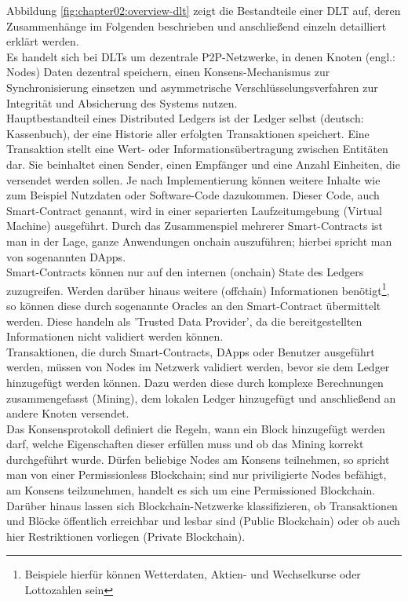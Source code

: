 Abbildung \ref{fig:chapter02:overview-dlt} zeigt die Bestandteile einer \ac{DLT} auf, deren Zusammenhänge im Folgenden beschrieben und anschließend einzeln detailliert erklärt werden.\\
Es handelt sich bei \acp{DLT} um dezentrale \ac{P2P}-Netzwerke, in denen Knoten (engl.: Nodes) Daten dezentral speichern, einen Konsens-Mechanismus zur Synchronisierung einsetzen und asymmetrische Verschlüsselungsverfahren zur Integrität und Absicherung des Systems nutzen. \cite{DLT2016}\\
Hauptbestandteil eines Distributed Ledgers ist der Ledger selbst (deutsch: Kassenbuch), der eine Historie aller erfolgten Transaktionen speichert. Eine Transaktion stellt eine Wert- oder Informationsübertragung zwischen Entitäten dar. Sie beinhaltet einen Sender, einen Empfänger und eine Anzahl Einheiten, die versendet werden sollen. Je nach Implementierung können weitere Inhalte wie zum Beispiel Nutzdaten oder Software-Code dazukommen. Dieser Code, auch Smart-Contract genannt, wird in einer separierten Laufzeitumgebung (Virtual Machine) ausgeführt. Durch das Zusammenspiel mehrerer Smart-Contracts ist man in der Lage, ganze Anwendungen onchain auszuführen; hierbei spricht man von sogenannten \acp{DApp}.\\
Smart-Contracts können nur auf den internen (onchain) State des Ledgers zuzugreifen. Werden darüber hinaus weitere (offchain) Informationen benötigt\footnote{Beispiele hierfür können Wetterdaten, Aktien- und Wechselkurse oder Lottozahlen sein}, so können diese durch sogenannte Oracles an den Smart-Contract übermittelt werden. Diese handeln als 'Trusted Data Provider', da die bereitgestellten Informationen nicht validiert werden können. \cite{ORACLE2019}\\
Transaktionen, die durch Smart-Contracts, \acp{DApp} oder Benutzer ausgeführt werden, müssen von Nodes im Netzwerk validiert werden, bevor sie dem Ledger hinzugefügt werden können. Dazu werden diese durch komplexe Berechnungen zusammengefasst (Mining), dem lokalen Ledger hinzugefügt und anschließend an andere Knoten versendet.\\
Das Konsensprotokoll definiert die Regeln, wann ein Block hinzugefügt werden darf, welche Eigenschaften dieser erfüllen muss und ob das Mining korrekt durchgeführt wurde. Dürfen beliebige Nodes am Konsens teilnehmen, so spricht man von einer Permissionless Blockchain; sind nur priviligierte Nodes befähigt, am Konsens teilzunehmen, handelt es sich um eine Permissioned Blockchain. Darüber hinaus lassen sich Blockchain-Netzwerke klassifizieren, ob Transaktionen und Blöcke öffentlich erreichbar und lesbar sind (Public Blockchain) oder ob auch hier Restriktionen vorliegen (Private Blockchain).\\
